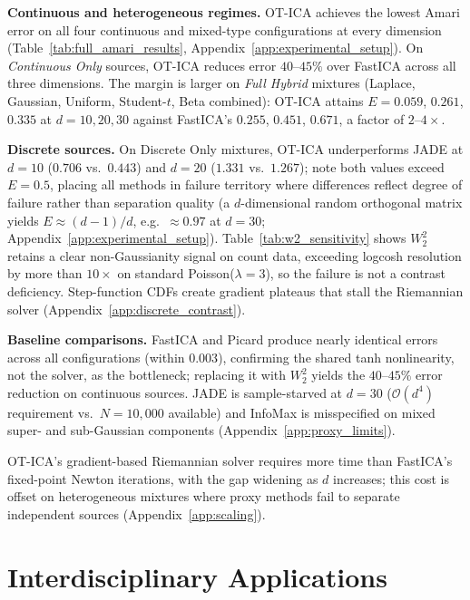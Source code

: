 \documentclass{tpm2026} %
\begin{document}
\textbf{Continuous and heterogeneous regimes.} OT-ICA achieves the lowest Amari error on all four continuous and mixed-type configurations at every dimension (Table~\ref{tab:full_amari_results}, Appendix~\ref{app:experimental_setup}). On \textit{Continuous Only} sources, OT-ICA reduces error $40$--$45\%$ over FastICA across all three dimensions. The margin is larger on \textit{Full Hybrid} mixtures (Laplace, Gaussian, Uniform, Student-$t$, Beta combined): OT-ICA attains $E = 0.059$, $0.261$, $0.335$ at $d = 10, 20, 30$ against FastICA's $0.255$, $0.451$, $0.671$, a factor of $2$--$4\times$.

\textbf{Discrete sources.} On Discrete Only mixtures, OT-ICA underperforms JADE at $d = 10$ ($0.706$ vs.\ $0.443$) and $d = 20$ ($1.331$ vs.\ $1.267$); note both values exceed $E = 0.5$, placing all methods in failure territory where differences reflect degree of failure rather than separation quality (a $d$-dimensional random orthogonal matrix yields $E \approx (d-1)/d$, e.g.\ $\approx 0.97$ at $d=30$; Appendix~\ref{app:experimental_setup}). Table~\ref{tab:w2_sensitivity} shows $W_2^2$ retains a clear non-Gaussianity signal on count data, exceeding logcosh resolution by more than $10{\times}$ on standard Poisson($\lambda=3$), so the failure is not a contrast deficiency. Step-function CDFs create gradient plateaus that stall the Riemannian solver (Appendix~\ref{app:discrete_contrast}).

\textbf{Baseline comparisons.} FastICA and Picard \citep{ablin2018faster} produce nearly identical errors across all configurations (within $0.003$), confirming the shared tanh nonlinearity, not the solver, as the bottleneck; replacing it with $W_2^2$ yields the $40$--$45\%$ error reduction on continuous sources. JADE is sample-starved at $d=30$ ($\mathcal{O}(d^4)$ requirement vs.\ $N=10{,}000$ available) and InfoMax is misspecified on mixed super- and sub-Gaussian components (Appendix~\ref{app:proxy_limits}).

OT-ICA's gradient-based Riemannian solver requires more time than FastICA's fixed-point Newton iterations, with the gap widening as $d$ increases; 
this cost is offset on heterogeneous mixtures where proxy methods fail to separate independent sources  (Appendix~\ref{app:scaling}).

\section{Interdisciplinary Applications}\label{sec:applications}
\end{document}
